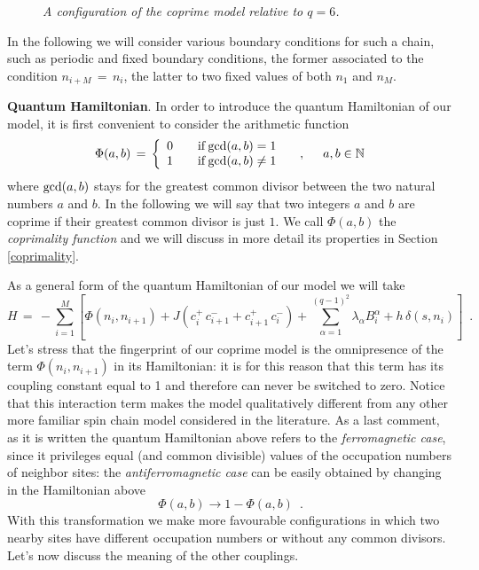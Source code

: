 \documentclass[aps,pra,superscriptaddress]{revtex4}
\newcommand\be            {\begin{equation}}
\newcommand\ee            {\end{equation}}
\renewcommand{\(}{\left(}
\renewcommand{\)}{\right)}
\renewcommand{\[}{\left[}
\renewcommand{\]}{\right]}
\begin{document}
\begin{figure}[t]
\begin{center}
\caption{{\em A configuration of the coprime model relative to $q=6$.}}
\label{coprimechainmodel}
\end{center}
\end{figure}

In the following we will consider various boundary conditions for such a chain, 
such as periodic and fixed boundary conditions, the former associated to the condition $n_{i+M} \,=\,n_i$, the latter to two fixed values of both $n_1$ and $n_M$. 

\vspace{3mm}
\noindent
{\bf Quantum Hamiltonian}. 
In order to introduce the quantum Hamiltonian of our model, it is first convenient to consider the arithmetic function 
\be \label{coprimalityfunction}
\Phi(a,b) \,=\,
\left\{ 
\begin{array} {lll}
0 & & {\rm if} \, {\rm gcd}(a,b) =1 \\
1 & & {\rm if} \, {\rm gcd}(a,b) \neq 1 
\end{array}
\hspace{5mm}
,
\hspace{5mm}
a,b \in \mathbb{N}
\right. 
\ee
where ${\rm gcd}(a,b)$ stays for the greatest common divisor between the two natural numbers $a$ and $b$. In the following we will say that 
two integers $a$ and $b$ are coprime if their greatest common divisor is just $1$.  We call $\Phi(a,b)$ the {\em coprimality function} and we will discuss in more detail its properties in Section \ref{coprimality}. 

\vspace{1mm}
As a general form of the quantum Hamiltonian of our model we will take   
\be 
H \,=\,-\sum_{i=1}^M \left[\Phi(n_i,n_{i+1}) + J  (c_i^+ \,c_{i+1}^- + c_{i+1}^+ \,c_i^-) + 
\sum_{\alpha=1}^{(q-1)^2} \lambda_{\alpha} B^{\alpha}_i   + h \,\delta(s,n_i)\right] \,\,\,. 
\label{quantumhamiltonian}
\ee
Let's stress that the fingerprint of our coprime model is the omnipresence of the term $\Phi(n_i,n_{i+1})$ in its Hamiltonian: it is for this reason that this term has its coupling constant equal to 1 and therefore can never be switched to zero. Notice that this interaction term makes the model qualitatively different from any other more familiar spin chain model considered in the literature. As a last comment, as it is written the quantum Hamiltonian above refers to the 
{\em ferromagnetic case}, since it privileges equal (and common divisible) values of the occupation numbers of neighbor sites: the {\em antiferromagnetic case} can be easily obtained by changing in the Hamiltonian above 
\be 
\Phi(a,b) \rightarrow 1 - \Phi(a,b)\,\,\,. 
\label{antiferromagnetic}
\ee
With this transformation we make more favourable configurations in which two nearby sites have different occupation numbers or 
without any common divisors. Let's now discuss the meaning of the other couplings. 
\end{document}
